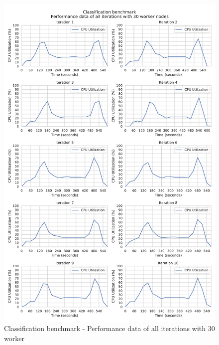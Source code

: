 \begin{figure}[h]
\centering
\includegraphics[scale=0.5]{images/appendix/evaluation_data/classification_benchmark/classification_30_worker_cpu_performance}
\caption{Classification benchmark - Performance data of all iterations with 30 worker}
\label{fig:appendix_eval_classification_static30}
\end{figure}

